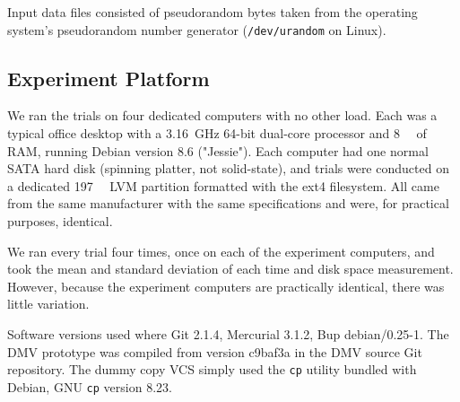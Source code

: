 Input data files consisted of pseudorandom bytes taken from the operating system's pseudorandom number generator (\lstinline{/dev/urandom} on Linux).

%

\subsection{Experiment Platform}

We ran the trials on four dedicated computers with no other load.
Each was a typical office desktop with a \SI{3.16}{\giga\hertz} \num{64}-bit dual-core processor and \SI{8}{\gibi\byte} of RAM, running Debian version 8.6 ("Jessie").
Each computer had one normal SATA hard disk (spinning platter, not solid-state), and trials were conducted on a dedicated \SI{197}{\gibi\byte} LVM partition formatted with the ext4 filesystem.
All came from the same manufacturer with the same specifications and were, for practical purposes, identical.

We ran every trial four times, once on each of the experiment computers, and took the mean and standard deviation of each time and disk space measurement.
However, because the experiment computers are practically identical, there was little variation.

Software versions used where Git 2.1.4, Mercurial 3.1.2, Bup \mbox{debian/0.25-1}.
The DMV prototype was compiled from version c9baf3a in the DMV source Git repository.
The dummy copy VCS simply used the \lstinline{cp} utility bundled with Debian, GNU \lstinline{cp} version 8.23.

%
